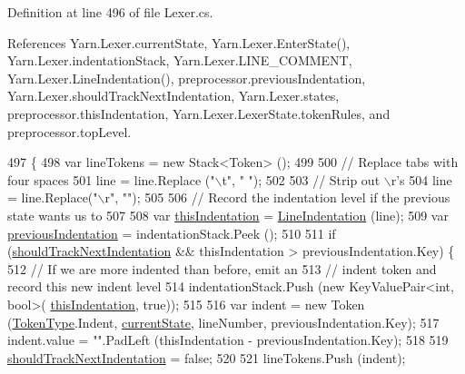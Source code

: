 Definition at line 496 of file Lexer.\-cs.



References Yarn.\-Lexer.\-current\-State, Yarn.\-Lexer.\-Enter\-State(), Yarn.\-Lexer.\-indentation\-Stack, Yarn.\-Lexer.\-L\-I\-N\-E\-\_\-\-C\-O\-M\-M\-E\-N\-T, Yarn.\-Lexer.\-Line\-Indentation(), preprocessor.\-previous\-Indentation, Yarn.\-Lexer.\-should\-Track\-Next\-Indentation, Yarn.\-Lexer.\-states, preprocessor.\-this\-Indentation, Yarn.\-Lexer.\-Lexer\-State.\-token\-Rules, and preprocessor.\-top\-Level.


\begin{DoxyCode}
497         \{
498             var lineTokens = \textcolor{keyword}{new} Stack<Token> ();
499 
500             \textcolor{comment}{// Replace tabs with four spaces}
501             line = line.Replace (\textcolor{stringliteral}{"\(\backslash\)t"}, \textcolor{stringliteral}{"    "});
502 
503             \textcolor{comment}{// Strip out \(\backslash\)r's}
504             line = line.Replace(\textcolor{stringliteral}{"\(\backslash\)r"}, \textcolor{stringliteral}{""});
505 
506             \textcolor{comment}{// Record the indentation level if the previous state wants us to}
507 
508             var \hyperlink{a00330_a0e59365a4aa5811f6495b92a51e23573}{thisIndentation} = \hyperlink{a00117_a4079b10b099e5d85f5482f9e7eac4179}{LineIndentation} (line);
509             var \hyperlink{a00330_ade44b858578c3eab7b6f90030a0e3ea1}{previousIndentation} = indentationStack.Peek ();
510 
511             \textcolor{keywordflow}{if} (\hyperlink{a00117_ac670aac2245cbd4694dfbd5b69313218}{shouldTrackNextIndentation} && thisIndentation > 
      previousIndentation.Key) \{
512                 \textcolor{comment}{// If we are more indented than before, emit an}
513                 \textcolor{comment}{// indent token and record this new indent level}
514                 indentationStack.Push (\textcolor{keyword}{new} KeyValuePair<int, bool>(
      \hyperlink{a00330_a0e59365a4aa5811f6495b92a51e23573}{thisIndentation}, \textcolor{keyword}{true}));
515 
516                 var indent = \textcolor{keyword}{new} Token (\hyperlink{a00041_a301aa7c866593a5b625a8fc158bbeace}{TokenType}.Indent, \hyperlink{a00117_ac90b7dce8103425a148f9e8588f14137}{currentState}, lineNumber, 
      previousIndentation.Key);
517                 indent.value = \textcolor{stringliteral}{""}.PadLeft (thisIndentation - previousIndentation.Key);
518 
519                 \hyperlink{a00117_ac670aac2245cbd4694dfbd5b69313218}{shouldTrackNextIndentation} = \textcolor{keyword}{false};
520 
521                 lineTokens.Push (indent);

\end{DoxyCode}
